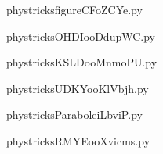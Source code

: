     \newcommand{\CaptionFigfigureCFoZCYe}{<+Type your caption here+>}
    \begin{center}
        
    \end{center}
    phystricksfigureCFoZCYe.py

    

    \clearpage
    


    \newcommand{\CaptionFigOHDIooDdupWC}{<+Type your caption here+>}
    \begin{center}
        
    \end{center}
    phystricksOHDIooDdupWC.py

    

    \clearpage
    


    \newcommand{\CaptionFigKSLDooMnmoPU}{<+Type your caption here+>}
    \begin{center}
        
    \end{center}
    phystricksKSLDooMnmoPU.py

    

    \clearpage
    


    \newcommand{\CaptionFigUDKYooKlVbjh}{<+Type your caption here+>}
    \begin{center}
        
    \end{center}
    phystricksUDKYooKlVbjh.py

    

    \clearpage
    


    \newcommand{\CaptionFigParaboleiLbviP}{<+Type your caption here+>}
    \begin{center}
        
    \end{center}
    phystricksParaboleiLbviP.py

    

    \clearpage
    


    \newcommand{\CaptionFigRMYEooXvicms}{<+Type your caption here+>}
    \begin{center}
        
    \end{center}
    phystricksRMYEooXvicms.py

